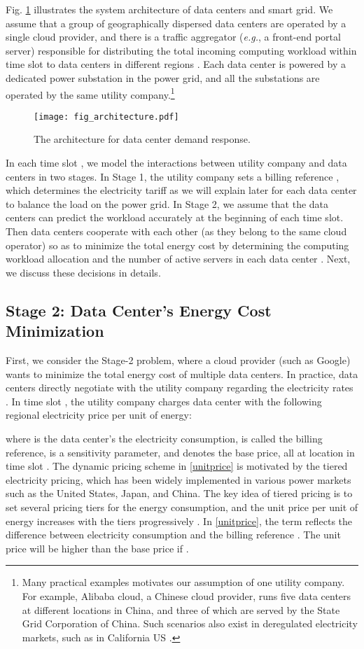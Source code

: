 \documentclass[journal]{IEEEtran}
\begin{document}
	Fig. \ref{fig_architecture} illustrates the system architecture of data centers and smart grid. We assume that a group of geographically dispersed data centers are operated by a single cloud provider, and there is a traffic aggregator (\emph{e.g.}, a front-end portal server) responsible for distributing the total incoming computing workload  within time slot  to data centers in different regions \cite{infocom}. Each data center is powered by a dedicated power substation in the power grid, and all the substations are operated by the same utility company.\footnote{Many practical examples motivates our assumption of one utility company. For example, Alibaba cloud, a Chinese cloud provider, runs five data centers at different locations in China, and three of which are served by the State Grid Corporation of China. Such scenarios also exist in deregulated electricity markets, such as in California US \cite{California}.}
	\begin{figure}[t]
		\centering
		\texttt{[image: fig\_architecture.pdf]}
		\caption{\label{fig_architecture}The architecture for data center demand response.}
\end{figure}
	In each time slot , we model the interactions between utility company and data centers in two stages. In Stage 1, the utility company sets a billing reference , which determines the electricity tariff as we will explain later for each data center  to balance the load on the power grid. In Stage 2, we assume that the data centers can predict the workload accurately at the beginning of each time slot. Then data centers cooperate with each other (as they belong to the same cloud operator) so as to minimize the total energy cost by determining the computing workload allocation  and the number of active servers  in each data center . Next, we discuss these decisions in details.
	

	\subsection{Stage 2: Data Center's Energy Cost Minimization}
	First, we consider the Stage-2 problem, where a cloud provider (such as Google) wants to minimize the total energy cost of multiple data centers. In practice, data centers directly negotiate with the utility company regarding the electricity rates \cite{contract}. In time slot , the utility company charges data center  with the following regional electricity price  per unit of energy:
	
	where  is the data center's the electricity consumption,  is called the billing reference,  is a sensitivity parameter, and  denotes the base price, all at location  in time slot . The dynamic pricing scheme in \eqref{unitprice} is motivated by the tiered electricity pricing, which has been widely implemented in various power markets such as the United States, Japan, and China. The key idea of tiered pricing is to set several pricing tiers for the energy consumption, and the unit price per unit of energy increases with the tiers progressively \cite{tier}. In \eqref{unitprice}, the term  reflects the difference between electricity consumption  and the billing reference . The unit price  will be higher than the base price if .
	
\end{document}
